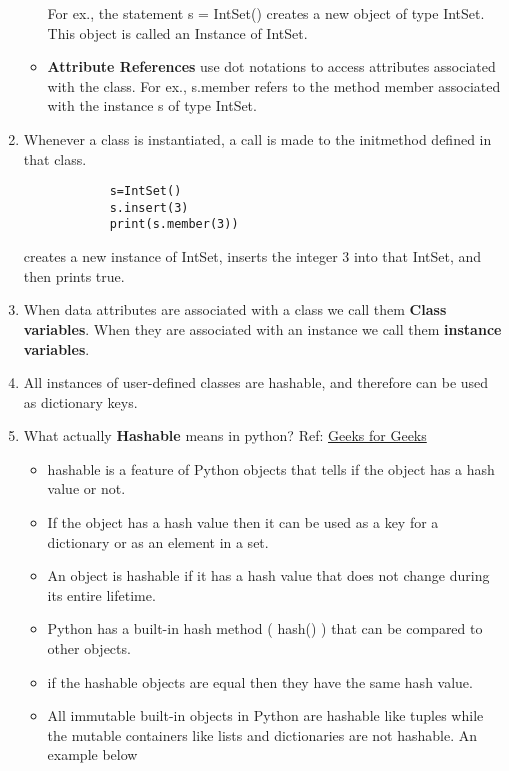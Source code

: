 \documentclass[11pt]{article}
\begin{document}
\begin{enumerate}
\begin{itemize}
            For ex., the statement s = IntSet() creates a new object of type IntSet. This object is called an Instance of IntSet.
            \item \textbf{Attribute References} use dot notations to access attributes associated with the class. For ex., s.member refers to the method member associated with the instance s of type IntSet.
        \end{itemize}
        \item Whenever a class is instantiated, a call is made to the \textunderscore\textunderscore init\textunderscore\textunderscore method defined in that class.
        \begin{verbatim}
            s=IntSet()
            s.insert(3)
            print(s.member(3))
        \end{verbatim}
        creates a new instance of IntSet, inserts the integer 3 into that IntSet, and then prints true.
        \item When data attributes are associated with a class we call them \textbf{Class variables}. When they are associated with an instance we call them \textbf{instance variables}.
        \item All instances of user-defined classes are hashable, and therefore can be used as dictionary keys.
        \item What actually \textbf{Hashable} means in python? Ref: \href{https://www.geeksforgeeks.org/why-and-how-are-python-functions-hashable/}{Geeks for Geeks}
        \begin{itemize}
            \item hashable is a feature of Python objects that tells if the object has a hash value or not.
            \item If the object has a hash value then it can be used as a key for a dictionary or as an element in a set.
            \item An object is hashable if it has a hash value that does not change during its entire lifetime.
            \item Python has a built-in hash method ( \textunderscore\textunderscore hash\textunderscore\textunderscore() ) that can be compared to other objects.
            \item if the hashable objects are equal then they have the same hash value.
            \item All immutable built-in objects in Python are hashable like tuples while the mutable containers like lists and dictionaries are not hashable. An example below

\end{itemize}
\end{enumerate}
\end{document}
